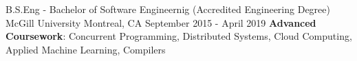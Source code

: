 


\begin{cventries}


\cventry
{B.S.Eng - Bachelor of Software Engineernig (Accredited Engineering Degree)} %
{McGill University} %
{Montreal, CA} %
{September 2015 - April 2019} %
{ %
    \textbf{Advanced Coursework}: Concurrent Programming, Distributed Systems, Cloud Computing, Applied Machine Learning, Compilers
}


\end{cventries}
